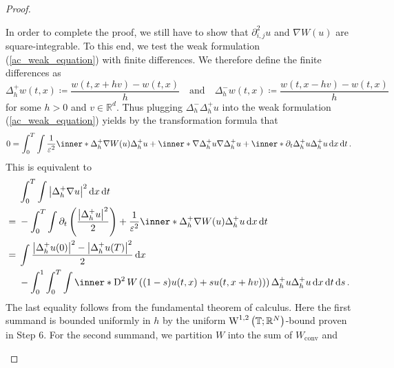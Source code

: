 \begin{proof}
\begin{description}[wide=0pt]
		In order to complete the proof, we still have to show that $ \partial_{ 
		i , j }^{ 2 } u$ and $ \nabla W ( u) $ are square-integrable.
		To this end, we test the weak formulation (\ref{ac_weak_equation}) with 
		finite differences. We therefore define the finite differences as
		\begin{equation*}
			\Delta_{ h }^{ + } w ( t , x ) \coloneqq \frac{ w ( t , x + h v ) - 
			w ( t , x ) }{ h }
			\quad\text{and}\quad
			\Delta_{ h }^{ - } w ( t , x ) \coloneqq \frac{ w ( t , x - h v ) - 
			w ( t , x ) }{ h }
		\end{equation*}
		for some $ h > 0 $ and $ v \in \mathbb{ R }^{ d } $. Thus plugging $ 
		\Delta_{ h }^{ - } \Delta_{ h }^{ + } u $ into the weak formulation 
		(\ref{ac_weak_equation}) yields by the transformation formula that
		\begin{equation*}
			0
			=
			\int_{ 0 }^{ T }
			\int
			\frac{ 1 }{ \varepsilon^{ 2 } }
			\inner*{ \Delta_{ h }^{ + } \nabla W ( u ) }{ \Delta_{ h }^{ + } u }
			+
			\inner*{ \nabla \Delta_{ h }^{ + } u }{ \nabla \Delta_{ h }^{ + } u }
			+
			\inner*{ \partial_{ t } \Delta_{ h }^{ + } u }{ \Delta_{ h }^{ + } u }
			\dd{ x }
			\dd{ t }.
		\end{equation*}
		This is equivalent to
		\begin{align*}
			& \int_{ 0 }^{ T }
			\int
			\abs{ \Delta_{ h }^{ + } \nabla u }^{ 2 }
			\dd{ x }
			\dd{ t }
			\\
			={} &
			-
			\int_{ 0 }^{ T }
			\int
			\partial_{ t } \left( \frac{ \abs{ \Delta_{ h }^{ + } u }^{ 2 } }{ 2 } \right)
			+
			\frac{ 1 }{ \varepsilon^{ 2 } }
			\inner*{ \Delta_{ h }^{ + } \nabla W ( u ) }{ \Delta_{ h }^{ + } u }
			\dd{ x }
			\dd{ t }
			\\
			={} &
			\int  
			\frac{ \abs{ \Delta_{ h }^{ + } u ( 0 ) }^{ 2 } - \abs{ \Delta_{ h }^{ + } u ( T ) }^{ 2 } }{ 2 }
			\dd{ x }
			\\
			& -
			\int_{ 0 }^{ 1 }
			\int_{ 0 }^{ T }
			\int
			\inner*{ 
				\diff^{ 2 } W \left( ( 1 - s ) u ( t, x  ) + s u( t,  x + h v ) ) \right) 
				\Delta_{ h }^{ + } u
			}{
				\Delta_{ h }^{ + } u 
			}
			\dd{ x }
			\dd{ t }
			\dd{ s }.
		\end{align*}
		The last equality follows from the fundamental theorem of calculus.
		Here the first summand is bounded uniformly in $ h $ by the uniform $ 
		\operatorname{W}^{ 1 , 2 } \left( 
		\operatorname{\mathbb{T}} ; \mathbb{ R }^{ N } \right) $-bound proven in Step 6. For 
		the second 
		summand, we partition $ W $ into the sum of $ W_{ \mathrm{conv} } $ and 

\end{description}
\end{proof}
